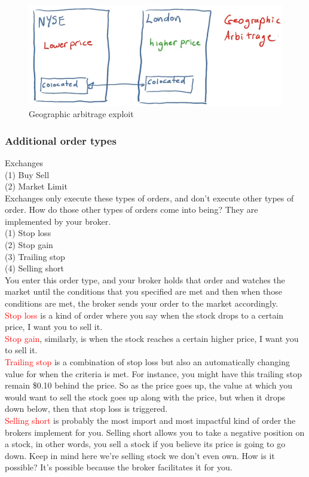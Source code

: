\documentclass[12pt]{article}
\begin{document}
\begin{figure}[!ht]
\centering
\includegraphics[scale=0.45]{fig/fig32}
\caption{Geographic arbitrage exploit}
\end{figure}

\subsubsection{Additional order types}

\noindent
Exchanges\\
(1) Buy Sell \\
(2) Market Limit \\
Exchanges only execute these types of orders, and don't execute other types of order. How do those other types of orders come into being? They are implemented by your broker. \\
(1) Stop loss \\
(2) Stop gain \\
(3) Trailing stop \\
(4) Selling short \\
You enter this order type, and your broker holds that order and watches the market until the conditions that you specified are met and then when those conditions are met, the broker sends your order to the market accordingly. \\[8pt]
\noindent
\textcolor{red}{Stop loss} is a kind of order where you say when the stock drops to a certain price, I want you to sell it. \\
\textcolor{red}{Stop gain}, similarly, is when the stock reaches a certain higher price, I want you to sell it. \\
\textcolor{red}{Trailing stop} is a combination of stop loss but also an automatically changing value for when the criteria is met. For instance, you might have this trailing stop remain \$0.10 behind the price. So as the price goes up, the value at which you would want to sell the stock goes up along with the price, but when it drops down below, then that stop loss is triggered. \\
\textcolor{red}{Selling short} is probably the most import and most impactful kind of order the brokers implement for you. Selling short allows you to take a negative position on a stock, in other words, you sell a stock if you believe its price is going to go down. Keep in mind here we're selling stock we don't even own. How is it possible? It's possible because the broker facilitates it for you.   
\end{document}
